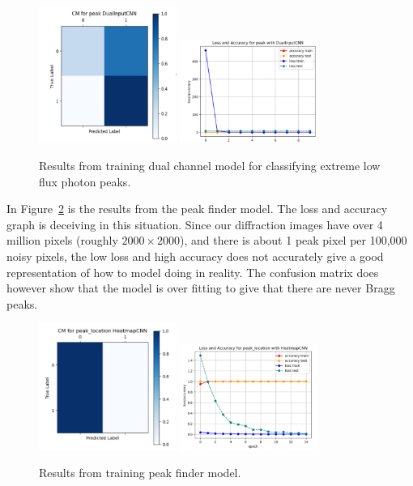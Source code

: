 \documentclass[12pt]{article}
\begin{document}
\begin{figure}[H]
    \centering
    \includegraphics[width=0.4\textwidth]{confusion_matrix/dual_cm.png}
    \includegraphics[width=0.4\textwidth]{loss_plot/dual_loss.png}
    \caption{Results from training dual channel model for classifying extreme low flux photon peaks.}
    \label{fig:dual}
\end{figure}

In Figure~\ref{fig:peak_finder} is the results from the peak finder model. The loss and accuracy graph is deceiving in this situation. Since our diffraction images have over 4 million pixels (roughly \(2000 \times 2000\)), and there is about 1 peak pixel per 100,000 noisy pixels, the low loss and high accuracy does not accurately give a good representation of how to model doing in reality. The confusion matrix does however show that the model is over fitting to give that there are never Bragg peaks.\\

\begin{figure}[H]
    \centering
    \includegraphics[width=0.4\textwidth]{confusion_matrix/peak_finder_cm.png}
    \includegraphics[width=0.4\textwidth]{loss_plot/peak_finder_loss.png}
    \caption{Results from training peak finder model.}
    \label{fig:peak_finder}
\end{figure}
\end{document}
